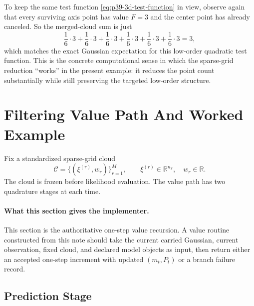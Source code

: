 \documentclass[11pt]{article}
\numberwithin{equation}{section}
\newcommand{\R}{\mathbb R}
\begin{document}
To keep the same test function \eqref{eq:p39-3d-test-function} in view, observe
again that every surviving axis point has value \(F=3\) and the center point has
already canceled.  So the merged-cloud sum is just
\begin{equation}
  \frac16\cdot 3 + \frac16\cdot 3 + \frac16\cdot 3 + \frac16\cdot 3 +
  \frac16\cdot 3 + \frac16\cdot 3 = 3,
  \label{eq:p39-3d-toy-cloud-sum}
\end{equation}
which matches the exact Gaussian expectation for this low-order quadratic test
function.  This is the concrete computational sense in which the sparse-grid
reduction ``works'' in the present example: it reduces the point count
substantially while still preserving the targeted low-order structure.

\section{Filtering Value Path And Worked Example}
\label{sec:p31-value-path}

Fix a standardized sparse-grid cloud
\begin{equation}
  \mathcal C=\{(\xi^{(r)},w_r)\}_{r=1}^M,
  \qquad
  \xi^{(r)}\in\R^{n_x},
  \quad
  w_r\in\R.
  \label{eq:p31-cloud-for-filter}
\end{equation}
The cloud is frozen before likelihood evaluation.  The value path has two
quadrature stages at each time.

\paragraph{What this section gives the implementer.}
This section is the authoritative one-step value recursion.  A value routine
constructed from this note should take the current carried Gaussian,
current observation, fixed cloud, and declared model objects as input, then
return either an accepted one-step increment with updated \((m_t,P_t)\) or a
branch failure record.

\subsection{Prediction Stage}
\end{document}
